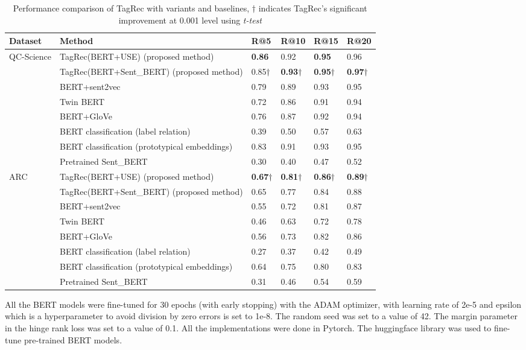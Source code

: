 \documentclass[runningheads, envcountsame, a4paper]{llncs}
\begin{document}
  \begin{table}
 \centering
\caption{Performance comparison of TagRec with variants and baselines, $\dagger$ indicates TagRec's significant improvement at 0.001 level using \textit{t-test}}\label{tab1}
\begin{tabular}{p{1.1cm}|p{7.2cm}|p{1cm}|p{1cm}|p{1cm}|p{1cm}}
Dataset & Method &  R@5 & R@10& R@15 & R@20\\
\hline\hline
QC-Science & TagRec(BERT+USE) (proposed method) & \bf 0.86 &0.92 & \bf0.95 & 0.96\\ 
&TagRec(BERT+Sent\_BERT) (proposed method) & 0.85$\dagger$ & \bf 0.93$\dagger$ & \bf 0.95$\dagger$ & \bf 0.97$\dagger$\\ \cline{2-6}
&BERT+sent2vec & 0.79 &0.89 & 0.93 & 0.95\\ 
&Twin BERT \cite{twinbert} & 0.72 &0.86 & 0.91 & 0.94\\ 
&BERT+GloVe & 0.76 &0.87 & 0.92 & 0.94\\ \cline{2-6}
&BERT classification (label relation) \cite{xumulti} \ & 0.39 &0.50 & 0.57 & 0.63 \\ 
&BERT classification (prototypical embeddings) \cite{snell2017prototypical} & 0.83 &0.91 & 0.93 & 0.95 \\ \cline{2-6}
& Pretrained Sent\_BERT  & 0.30 &0.40 & 0.47 & 0.52 \\ 
\hline
ARC & TagRec(BERT+USE) (proposed method) & \bf 0.67$\dagger$ & \bf0.81$\dagger$ & \bf0.86$\dagger$ & \bf0.89$\dagger$\\ 
&TagRec(BERT+Sent\_BERT) (proposed method) & 0.65 &  0.77 &  0.84 &  0.88\\ \cline{2-6}
&BERT+sent2vec & 0.55 &0.72 & 0.81 & 0.87\\ 
&Twin BERT \cite{twinbert} & 0.46 &0.63 & 0.72 & 0.78\\ 
&BERT+GloVe & 0.56 &0.73 & 0.82 & 0.86\\ \cline{2-6}
&BERT classification (label relation) \cite{xumulti} \ & 0.27 &0.37 & 0.42 & 0.49 \\ 
&BERT classification (prototypical embeddings) \cite{snell2017prototypical} & 0.64 &0.75 & 0.80 & 0.83 \\ \cline{2-6}
& Pretrained Sent\_BERT  & 0.31 &0.46 & 0.54 & 0.59 \\ 
\hline
\end{tabular}
\end{table}



All the BERT models were fine-tuned for 30 epochs (with early stopping) with the ADAM optimizer, with learning rate of 2e-5 \cite{BERT} and epsilon which is a hyperparameter to avoid division by zero errors is set to 1e-8.
The random seed was set to a value of 42. The margin parameter in the hinge rank loss was set to a value of 0.1. All the implementations were done in Pytorch. The huggingface library \cite{wolf-etal-2020-transformers} was used to fine-tune pre-trained BERT models.
\end{document}
